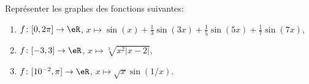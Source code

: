 \begin{exercice}\label{exoSC_serie2-0004}

Représenter les graphes des fonctions suivantes:
\begin{enumerate}

	\item
		$f\colon \mathopen[ 0 , 2\pi \mathclose]\to \eR$, $x\mapsto \sin(x)+\frac{1}{ 3 }\sin(3x)+\frac{1}{ 5 }\sin(5x)+\frac{1}{ 7 }\sin(7x)$,
	\item
		$f\colon \mathopen[ -3 , 3 \mathclose]\to \eR$, $x\mapsto\sqrt[3]{x^2| x-2 |}$,
	\item
		$f\colon \mathopen[ 10^{-2} , \pi \mathclose]\to \eR$, $x\mapsto\sqrt{x}\sin(1/x)$.

\end{enumerate}

\end{exercice}
